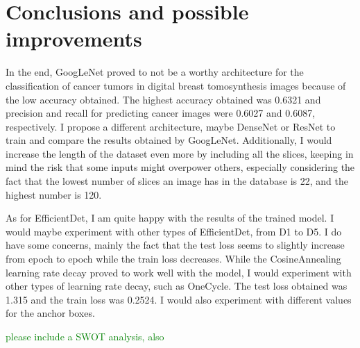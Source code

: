 \chapter{Conclusions and possible improvements}
\label{chap:ch6}

In the end, GoogLeNet proved to not be a worthy architecture for the classification of cancer tumors in digital breast tomosynthesis images because of the low accuracy obtained. The highest accuracy obtained was 0.6321 and precision and recall for predicting cancer images were 0.6027 and 0.6087, respectively. I propose a different architecture, maybe DenseNet or ResNet to train and compare the results obtained by GoogLeNet. Additionally, I would increase the length of the dataset even more by including all the slices, keeping in mind the risk that some inputs might overpower others, especially considering the fact that the lowest number of slices an image has in the database is 22, and the highest number is 120.

As for EfficientDet, I am quite happy with the results of the trained model. I would maybe experiment with other types of EfficientDet, from D1 to D5. I do have some concerns, mainly the fact that the test loss seems to slightly increase from epoch to epoch while the train loss decreases. While the CosineAnnealing learning rate decay proved to work well with the model, I would experiment with other types of learning rate decay, such as OneCycle. The test loss obtained was 1.315 and the train loss was 0.2524. I would also experiment with different values for the anchor boxes.


\textcolor{green}{please include a SWOT analysis, also} 